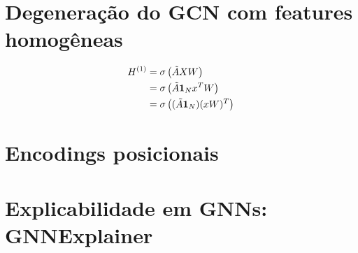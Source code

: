 \section{Degenera\c{c}\~ao do GCN com features homog\^eneas}
\label{sec:degeneracao}

%

\begin{align}
H^{(1)} &= \sigma\left(\tilde{A} X W\right) \notag \\
        &= \sigma\left(\tilde{A} \mathbf{1}_N x^T W\right) \notag \\
        &= \sigma\left((\tilde{A} \mathbf{1}_N)(x W)^T\right)
\label{eq:degeneracao}
\end{align}


\section{Encodings posicionais}
\label{sec:encodings}

%
%

\section{Explicabilidade em GNNs: GNNExplainer}
\label{sec:gnn_explainer}

%
%

